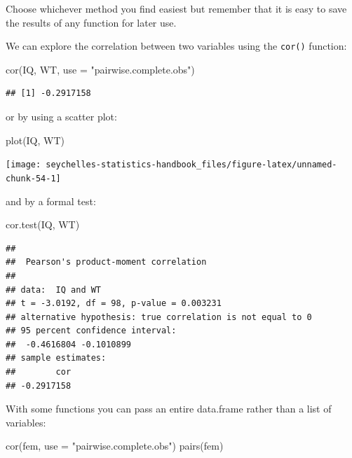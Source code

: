 \documentclass[
  12pt,
]{book}
\newenvironment{Shaded}{\begin{snugshade}}{\end{snugshade}}
\newcommand{\AttributeTok}[1]{\textcolor[rgb]{0.77,0.63,0.00}{#1}}
\newcommand{\FunctionTok}[1]{\textcolor[rgb]{0.00,0.00,0.00}{#1}}
\newcommand{\NormalTok}[1]{#1}
\newcommand{\StringTok}[1]{\textcolor[rgb]{0.31,0.60,0.02}{#1}}
\begin{document}
Choose whichever method you find easiest but remember that it is easy to save the results of any function for later use.

We can explore the correlation between two variables using the \texttt{cor()} function:

\begin{Shaded}
\begin{Highlighting}[]
\FunctionTok{cor}\NormalTok{(IQ, WT, }\AttributeTok{use =} \StringTok{"pairwise.complete.obs"}\NormalTok{)}
\end{Highlighting}
\end{Shaded}

\begin{verbatim}
## [1] -0.2917158
\end{verbatim}

\newpage

or by using a scatter plot:

\begin{Shaded}
\begin{Highlighting}[]
\FunctionTok{plot}\NormalTok{(IQ, WT)}
\end{Highlighting}
\end{Shaded}

\begin{center}\texttt{[image: seychelles-statistics-handbook\_files/figure-latex/unnamed-chunk-54-1]} \end{center}

and by a formal test:

\begin{Shaded}
\begin{Highlighting}[]
\FunctionTok{cor.test}\NormalTok{(IQ, WT)}
\end{Highlighting}
\end{Shaded}

\begin{verbatim}
## 
##  Pearson's product-moment correlation
## 
## data:  IQ and WT
## t = -3.0192, df = 98, p-value = 0.003231
## alternative hypothesis: true correlation is not equal to 0
## 95 percent confidence interval:
##  -0.4616804 -0.1010899
## sample estimates:
##        cor 
## -0.2917158
\end{verbatim}

\newpage

With some functions you can pass an entire data.frame rather than a list of variables:

\begin{Shaded}
\begin{Highlighting}[]
\FunctionTok{cor}\NormalTok{(fem, }\AttributeTok{use =} \StringTok{"pairwise.complete.obs"}\NormalTok{)}
\FunctionTok{pairs}\NormalTok{(fem)}
\end{Highlighting}
\end{Shaded}
\end{document}

